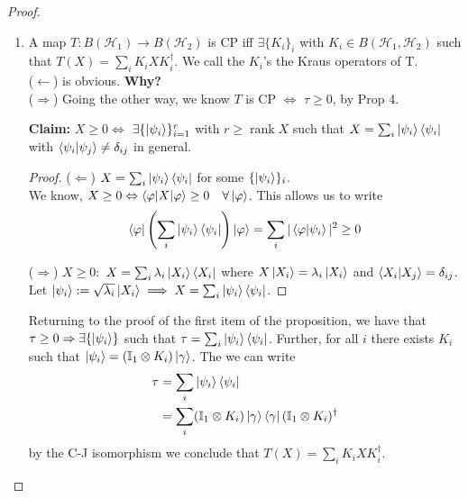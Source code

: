 \documentclass[10pt,oneside,longbibliography]{report}
\DeclareMathOperator{\rank}{rank}
\begin{document}
\begin{tcolorbox}[colframe=black,breakable, colback=black!5, arc=0pt, outer arc=0pt,boxrule=0.5pt]
\begin{proof}
\begin{enumerate}
    \item A map $T:B(\mathcal{H}_1)\rightarrow B(\mathcal{H}_2)$ is CP iff $\exists \{K_i\}_i$ with $K_i \in B(\mathcal{H}_1,\mathcal{H}_2)$ such that $T(X) = \sum_i K_i X K_i^{\dagger}$. We call the $K_i$'s the Kraus operators of T.\\
    
    ($\leftarrow$) is obvious. \textbf{Why?}\\
    
    ($\Rightarrow$) Going the other way, we know $T$ is CP $\Leftrightarrow$ $\tau \geq 0$, by Prop 4. 
    
    \textbf{Claim:} $X\geq 0 \Leftrightarrow$ $\exists \{\ket{\psi_i}\}_{i=1}^r$ with $r \geq \rank X$ such that $X=\sum_i \ket{\psi_i}\bra{\psi_i}$ with $\braket{\psi_i | \psi_j} \neq \delta_{ij}$ in general. 
    \begin{proof}
    ($\Leftarrow$) $X = \sum_i \ket{\psi_i}\bra{\psi_i}$ for some $\{\ket{\psi_i}\}_i$. \\
    
    We know, $X \geq 0 \Leftrightarrow \braket{\varphi|X|\varphi} \geq 0 \quad \forall \ket{\varphi}$. This allows us to write
    \begin{align}
        \bra{\varphi}\left(\sum_i \ket{\psi_i}\bra{\psi_i}\right)\ket{\varphi} = \sum_i |\braket{\varphi|\psi_i}|^2 \geq 0
    \end{align}
    
    ($\Rightarrow$) $X \geq 0: $ $X=\sum_i \lambda_i \ket{X_i}\bra{X_i}$ where $X\ket{X_i} = \lambda_i \ket{X_i}$ and $\braket{X_i | X_j} = \delta_{ij}$. Let $\ket{\psi_i}:= \sqrt{\lambda_i}\ket{X_i} \implies X=\sum_i \ket{\psi_i}\bra{\psi_i}$.
    \end{proof}
    Returning to the proof of the first item of the proposition, we have that $\tau \geq 0 \Rightarrow \exists \{\ket{\psi_i}\}$ such that $\tau = \sum_i \ket{\psi_i}\bra{\psi_i}$. Further, for all $i$ there exists $K_i$ such that $\ket{\psi_i} =(\mathbb{I}_1 \otimes K_i)\ket{\gamma}$. The we can write
    \begin{align}
        \tau &= \sum_i \ket{\psi_i}\bra{\psi_i} \\
        &= \sum_i (\mathbb{I}_1 \otimes K_i) \ket{\gamma} \bra{\gamma} (\mathbb{I}_1 \otimes K_i)^{\dagger}
    \end{align}
    by the C-J isomorphism we conclude that $T(X) = \sum_i K_i X K_i^{\dagger}$.
    

\end{enumerate}
\end{proof}
\end{tcolorbox}
\end{document}
